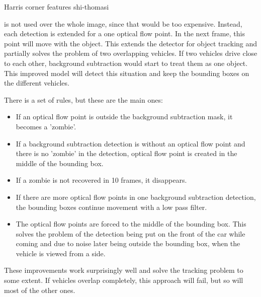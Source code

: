 \documentclass[a4paper,12pt,titlepage, twoside]{article}
\numberwithin{figure}{section}
\begin{document}
Harris corner features
shi-thomasi


is not used over the whole image, since that would be too expensive. Instead, each detection is extended for a one optical flow point. In the next frame, this point will move with the object. This extends the detector for object tracking and partially solves the problem of two overlapping vehicles. If two vehicles drive close to each other, background subtraction would start to treat them as one object. This improved model will detect this situation and keep the bounding boxes on the different vehicles. 

There is a set of rules, but these are the main ones:
\begin{itemize}
	\item If an optical flow point is outside the background subtraction mask, it becomes a 'zombie'.
	\item If a background subtraction detection is without an optical flow point and there is no 'zombie' in the detection, optical flow point is created in the middle of the bounding box. 
	\item If a zombie is not recovered in 10 frames, it disappears. 
	\item If there are more optical flow points in one background subtraction detection, the bounding boxes continue movement with a low pass filter.
	\item The optical flow points are forced to the middle of the bounding box. This solves the problem of the detection being put on the front of the car while coming and due to noise later being outside the bounding box, when the vehicle is viewed from a side. 
\end{itemize}

These improvements work surprisingly well and solve the tracking problem to some extent. If vehicles overlap completely, this approach will fail, but so will most of the other ones. 











{}
\cleardoublepage
\clearpage
\end{document}

